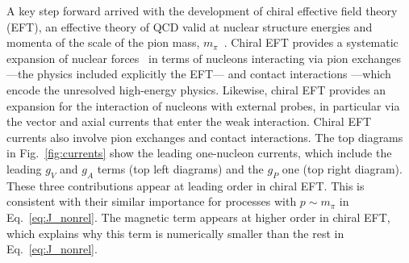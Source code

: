 A key step forward arrived with the development of chiral effective field theory (EFT), an effective theory of QCD valid at nuclear structure energies and momenta of the scale of the pion mass, $m_\pi$~\cite{Epelbaum:2008ga}. Chiral EFT provides a systematic expansion of nuclear forces~\cite{Machleidt:2011zz,Hammer:2012id} in terms of nucleons interacting via pion exchanges ---the physics included explicitly the EFT--- and contact interactions  ---which encode the unresolved high-energy physics. Likewise, chiral EFT provides an expansion for the interaction of nucleons with external probes, in particular via the vector and axial currents that enter the weak interaction. Chiral EFT currents also involve pion exchanges and contact interactions. The top diagrams in Fig.~\ref{fig:currents} show the leading one-nucleon currents, which include the leading $g_V$ and $g_A$ terms (top left diagrams) and the $g_P$ one (top right diagram). These three contributions appear at leading order in chiral EFT. This is consistent with their similar importance for processes with $p\sim m_{\pi}$ in Eq.~\eqref{eq:J_nonrel}. The magnetic term appears at higher order in chiral EFT, which explains why this term is numerically smaller than the rest in Eq.~\eqref{eq:J_nonrel}.

